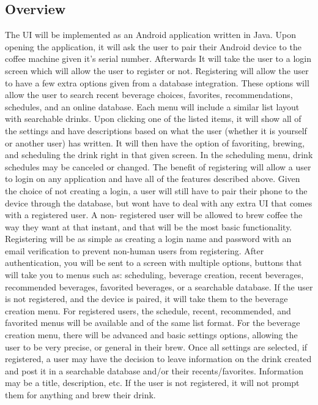 \documentclass[conference]{IEEEtran}
\begin{document}
\subsection{Overview}
The UI will be implemented as an Android application written in Java. Upon
opening the application, it will ask the user to pair their Android device to the coffee machine given it's serial number. Afterwards It will 
take the user to a login screen which will allow the user to register or not. Registering will allow the user 
to have a
few extra options given from a database integration. These options will allow the user to search recent
beverage choices, favorites, recommendations, schedules, and an online database. Each menu will 
include a similar list layout with searchable drinks. Upon clicking one of the listed items, it will show all 
of the settings and have descriptions based on what the user (whether it is yourself or another user) has 
written. It will then have the option of favoriting, brewing, and scheduling the drink right in that given 
screen. In the scheduling menu, drink schedules may be canceled or changed. The benefit of 
registering will allow a user to login on any application and have all of the features described above. 
Given the choice of not creating a login, a user will still have to pair their phone to the device through 
the database, but wont have to deal with any extra UI that comes with a registered user. A non-
registered user will be allowed to brew coffee the way they want at that instant, and that will be 
the most basic functionality. Registering will be as simple as creating a login
name and password with an email verification to prevent non-human users from
registering. After authentication, you will be sent to a screen with multiple options, buttons that will take you to menus such as: scheduling, beverage 
creation, recent beverages, recommended beverages, favorited beverages, or a searchable database. 
If the user is not registered, and the device is paired, it will take them to the beverage creation menu. 
For registered users, the schedule, recent, recommended, and favorited menus will be available and of 
the same list format. For the beverage creation menu, there will be advanced and basic settings 
options, allowing the user to be very precise, or general in their brew. Once all settings are selected, if 
registered, a user may have the decision to leave information on the drink created and post it in a 
searchable database and/or their recents/favorites. Information may be a title, description, etc. If the user is not registered, it will not prompt them for anything and brew their drink.
\end{document}
